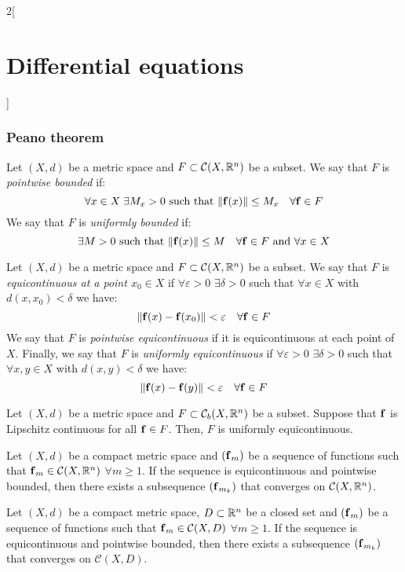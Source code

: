 \documentclass[../../../main.tex]{subfiles}
\begin{document}
\begin{multicols}{2}[\section{Differential equations}]
    \subsubsection{Peano theorem}
    \begin{definition}
        Let $(X,d)$ be a metric space and $F\subset\mathcal{C}(X,\mathbb{R}^n)$ be a subset. We say that $F$ is \textit{pointwise bounded} if: $$\forall x\in X\;\exists M_x>0\text{ such that }\|\boldsymbol{\mathrm{f}}(x)\|\leq M_x\quad\forall\boldsymbol{\mathrm{f}}\in F$$
        We say that $F$ is \textit{uniformly bounded} if: $$\exists M>0\text{ such that }\|\boldsymbol{\mathrm{f}}(x)\|\leq M \quad\forall\boldsymbol{\mathrm{f}}\in F\text{ and }\forall x\in X$$
    \end{definition}
    \begin{definition}
        Let $(X,d)$ be a metric space and $F\subset\mathcal{C}(X,\mathbb{R}^n)$ be a subset. We say that $F$ is \textit{equicontinuous at a point $x_0\in X$} if $\forall \varepsilon>0$ $\exists \delta>0$ such that $\forall x\in X$ with $d(x,x_0)<\delta$ we have: $$\|\boldsymbol{\mathrm{f}}(x)-\boldsymbol{\mathrm{f}}(x_0)\|<\varepsilon\quad\forall\boldsymbol{\mathrm{f}}\in F$$
        We say that $F$ is \textit{pointwise equicontinuous} if it is equicontinuous at each point of $X$. Finally, we say that $F$ is \textit{uniformly equicontinuous} if $\forall \varepsilon>0$ $\exists \delta>0$ such that $\forall x,y\in X$ with $d(x,y)<\delta$ we have: $$\|\boldsymbol{\mathrm{f}}(x)-\boldsymbol{\mathrm{f}}(y)\|<\varepsilon\quad\forall\boldsymbol{\mathrm{f}}\in F$$
    \end{definition}
    \begin{prop}
        Let $(X,d)$ be a metric space and $F\subset\mathcal{C}_b(X,\mathbb{R}^n)$ be a subset. Suppose that $\boldsymbol{\mathrm{f}}$ is Lipschitz continuous for all $\boldsymbol{\mathrm{f}}\in F$. Then, $F$ is uniformly equicontinuous.
    \end{prop}
    \begin{theorem}
        Let $(X,d)$ be a compact metric space and $(\boldsymbol{\mathrm{f}}_m)$ be a sequence of functions such that $\boldsymbol{\mathrm{f}}_m\in\mathcal{C}(X,\mathbb{R}^n)$ $\forall m\geq 1$. If the sequence is equicontinuous and pointwise bounded, then there exists a subsequence $(\boldsymbol{\mathrm{f}}_{m_k})$ that converges on $\mathcal{C}(X,\mathbb{R}^n)$.
    \end{theorem}
    \begin{corollary}
        Let $(X,d)$ be a compact metric space, $D\subset\mathbb{R}^n$ be a closed set and $(\boldsymbol{\mathrm{f}}_m)$ be a sequence of functions such that $\boldsymbol{\mathrm{f}}_m\in\mathcal{C}(X,D)$ $\forall m\geq 1$. If the sequence is equicontinuous and pointwise bounded, then there exists a subsequence $(\boldsymbol{\mathrm{f}}_{m_k})$ that converges on $\mathcal{C}(X,D)$.

\end{corollary}
\end{multicols}
\end{document}
